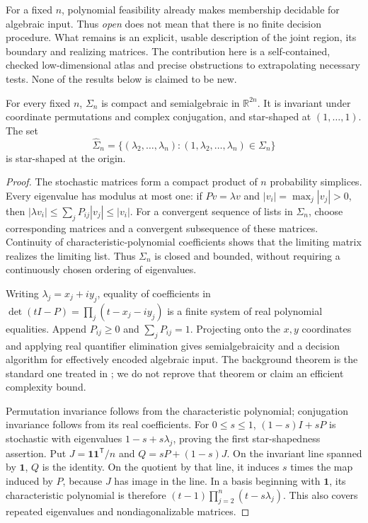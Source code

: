 For a fixed \(n\), polynomial feasibility already makes membership
decidable for algebraic input. Thus \emph{open} does not mean that there is
no finite decision procedure. What remains is an explicit, usable
description of the joint region, its boundary and realizing matrices.
The contribution here is a self-contained, checked low-dimensional atlas
and precise obstructions to extrapolating necessary tests.
None of the results below is claimed to be new.

\begin{proposition}
\label{prop:stochastic-geometry}
For every fixed \(n\), \(\Sigma_n\) is compact and semialgebraic in
\(\mathbb R^{2n}\). It is invariant under coordinate permutations and
complex conjugation, and star-shaped at \((1,\ldots,1)\).
The set
\[
 \widehat\Sigma_n=\{(\lambda_2,\ldots,\lambda_n):
                         (1,\lambda_2,\ldots,\lambda_n)\in\Sigma_n\}
\]
is star-shaped at the origin.
\end{proposition}
\begin{proof}
The stochastic matrices form a compact product of \(n\) probability
simplices. Every eigenvalue has modulus at most one: if \(Pv=\lambda v\)
and \(|v_i|=\max_j|v_j|>0\), then
\(|\lambda v_i|\leq\sum_jP_{ij}|v_j|\leq|v_i|\).
For a convergent sequence of lists in \(\Sigma_n\), choose corresponding
matrices and a convergent subsequence of these matrices. Continuity of
characteristic-polynomial coefficients shows that the limiting matrix
realizes the limiting list. Thus \(\Sigma_n\) is closed and bounded,
without requiring a continuously chosen ordering of eigenvalues.

Writing \(\lambda_j=x_j+iy_j\), equality of coefficients in
\(\det(tI-P)=\prod_j(t-x_j-iy_j)\) is a finite system of real
polynomial equalities. Append \(P_{ij}\geq0\) and
\(\sum_jP_{ij}=1\). Projecting onto the \(x,y\) coordinates and applying
real quantifier elimination gives semialgebraicity and a decision
algorithm for effectively encoded algebraic input.
The background theorem is the standard one treated in
\citet[Chapters~2, 13--14]{basupollackroy2006algorithms};
we do not reprove that theorem or claim an efficient complexity bound.

Permutation invariance follows from the characteristic polynomial;
conjugation invariance follows from its real coefficients.
For \(0\leq s\leq1\), \((1-s)I+sP\) is stochastic with eigenvalues
\(1-s+s\lambda_j\), proving the first star-shapedness assertion.
Put \(J=\mathbf1\mathbf1^{\mathsf T}/n\) and \(Q=sP+(1-s)J\).
On the invariant line spanned by \(\mathbf1\), \(Q\) is the identity.
On the quotient by that line, it induces \(s\) times the map induced
by \(P\), because \(J\) has image in the line.
In a basis beginning with \(\mathbf1\), its characteristic polynomial
is therefore \((t-1)\prod_{j=2}^n(t-s\lambda_j)\).
This also covers repeated eigenvalues and nondiagonalizable matrices.
\end{proof}

